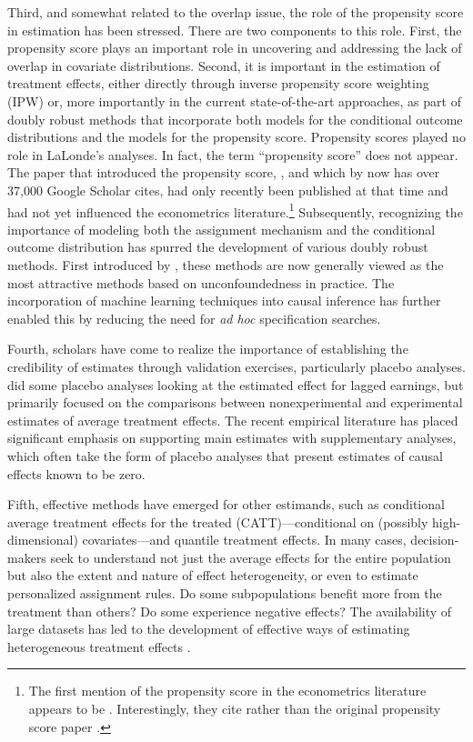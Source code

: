 \documentclass[letterpaper,12pt,leqno]{article}
\begin{document}
Third, and somewhat related to the overlap issue, the role of the propensity score in estimation has been stressed. There are two components to this role. First, the propensity score plays an important role in uncovering and addressing the lack of overlap in covariate distributions. Second, it is important in the estimation of treatment effects, either directly through inverse propensity score weighting (IPW) or, more importantly in the current state-of-the-art approaches, as part of doubly robust methods that incorporate both models for the conditional outcome distributions and the models for the propensity score. Propensity scores played no role in LaLonde's analyses. In fact, the term ``propensity score'' does not appear. The paper that introduced the propensity score, \citet{rosenbaum1983central}, and which by now has over 37,000 Google Scholar cites, had only recently been published at that time and had not yet influenced the econometrics literature.\footnote{The first mention of the propensity score in the econometrics literature appears to be \citet{card1988measuring}. Interestingly, they cite \citet{rosenbaum1984reducing}
rather than the original propensity score paper \citet{rosenbaum1983central}.} Subsequently, recognizing the importance of modeling both the assignment mechanism and the conditional outcome distribution has spurred the development of various doubly robust methods. First introduced by \citet{scharfstein1999comments}, these methods are now generally viewed as the most attractive methods based on unconfoundedness in practice. The incorporation of machine learning techniques into causal inference has further enabled this by reducing the need for {\it ad hoc}  specification searches. 

Fourth, scholars have come to realize the importance of establishing the credibility of estimates through validation exercises, particularly placebo analyses. \citet{LaLonde} did some placebo analyses looking at the estimated effect for lagged earnings, but primarily focused on the comparisons between nonexperimental and experimental estimates of average treatment effects. The recent empirical literature has placed significant emphasis on supporting main estimates with supplementary analyses, which often take the form of placebo analyses that present estimates of causal effects known to be zero.

Fifth, effective methods have emerged for other estimands, such as conditional average treatment effects for the treated (CATT)---conditional on (possibly high-dimensional) covariates---and quantile treatment effects. In many cases, decision-makers seek to understand not just the average effects for the entire population but also the extent and nature of effect heterogeneity, or even to estimate personalized assignment rules. Do some subpopulations benefit more from the treatment than others? Do some experience negative effects? The availability of large datasets has led to the development of effective ways of estimating heterogeneous treatment effects  \citep[{\it e.g.},][]{wager2018estimation}.
\end{document}
